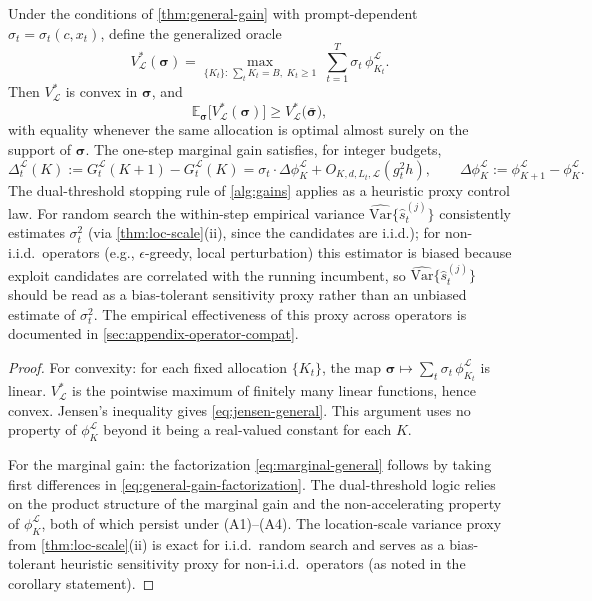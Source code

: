 \begin{corollary}
\label{cor:online-general}
Under the conditions of \cref{thm:general-gain} with prompt-dependent $\sigma_t = \sigma_t(c, x_t)$, define the generalized oracle
\begin{equation}
  V_{\mathcal{L}}^*(\boldsymbol{\sigma}) = \max_{\{K_t\}:\,\sum_t K_t = B,\;K_t \ge 1}\;\sum_{t=1}^{T} \sigma_t\,\phi_{K_t}^{\mathcal{L}}.
  \label{eq:oracle-general}
\end{equation}
Then $V_{\mathcal{L}}^*$ is convex in $\boldsymbol{\sigma}$, and
\begin{equation}
  \mathbb{E}_{\boldsymbol{\sigma}}\bigl[V_{\mathcal{L}}^*(\boldsymbol{\sigma})\bigr] \ge V_{\mathcal{L}}^*\bigl(\bar{\boldsymbol{\sigma}}\bigr),
  \label{eq:jensen-general}
\end{equation}
with equality whenever the same allocation is optimal almost surely on the support of $\boldsymbol{\sigma}$. The one-step marginal gain satisfies, for integer budgets,
\begin{equation}
  \Delta_t^{\mathcal{L}}(K) := G_t^{\mathcal{L}}(K{+}1) - G_t^{\mathcal{L}}(K) = \sigma_t \cdot \Delta\phi_K^{\mathcal{L}} + O_{K,d,L_t,\mathcal{L}}(g_t^2 h),
  \qquad \Delta\phi_K^{\mathcal{L}} := \phi_{K+1}^{\mathcal{L}} - \phi_K^{\mathcal{L}}.
  \label{eq:marginal-general}
\end{equation}
The dual-threshold stopping rule of \cref{alg:gains} applies as a heuristic proxy control law. For random search the within-step empirical variance $\widehat{\mathrm{Var}}\{\hat s_t^{(j)}\}$ consistently estimates $\sigma_t^2$ (via \cref{thm:loc-scale}\textup{(ii)}, since the candidates are i.i.d.); for non-i.i.d.\ operators (e.g., $\epsilon$-greedy, local perturbation) this estimator is biased because exploit candidates are correlated with the running incumbent, so $\widehat{\mathrm{Var}}\{\hat s_t^{(j)}\}$ should be read as a bias-tolerant sensitivity proxy rather than an unbiased estimate of $\sigma_t^2$. The empirical effectiveness of this proxy across operators is documented in \cref{sec:appendix-operator-compat}.
\end{corollary}
%
\begin{proof}
For convexity: for each fixed allocation $\{K_t\}$, the map $\boldsymbol{\sigma} \mapsto \sum_t \sigma_t\,\phi_{K_t}^{\mathcal{L}}$ is linear. $V_{\mathcal{L}}^*$ is the pointwise maximum of finitely many linear functions, hence convex. Jensen's inequality gives \cref{eq:jensen-general}. This argument uses no property of $\phi_K^{\mathcal{L}}$ beyond it being a real-valued constant for each $K$.

For the marginal gain: the factorization \cref{eq:marginal-general} follows by taking first differences in \cref{eq:general-gain-factorization}. The dual-threshold logic relies on the product structure of the marginal gain and the non-accelerating property of $\phi_K^{\mathcal{L}}$, both of which persist under (A1)--(A4). The location-scale variance proxy from \cref{thm:loc-scale}\textup{(ii)} is exact for i.i.d.\ random search and serves as a bias-tolerant heuristic sensitivity proxy for non-i.i.d.\ operators (as noted in the corollary statement).
\end{proof}
%
